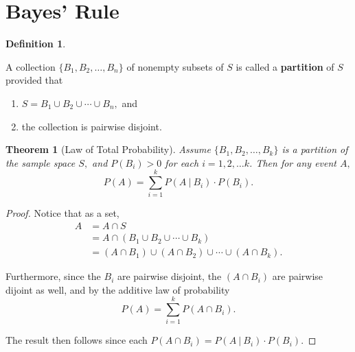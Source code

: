 \documentclass[
]{book}
\providecommand{\tightlist}{%
  \setlength{\itemsep}{0pt}\setlength{\parskip}{0pt}}
\newtheorem{theorem}{Theorem}[chapter]
\theoremstyle{definition}
\newtheorem{definition}{Definition}[chapter]
\theoremstyle{definition}
\theoremstyle{definition}
\theoremstyle{definition}
\theoremstyle{remark}
\begin{document}
\section{Bayes' Rule}\label{bayes-rule}

\begin{definition}
\protect\hypertarget{def:partition}{}\label{def:partition}

A collection \(\{B_1, B_2, \ldots, B_n\}\) of nonempty subsets of \(S\) is called a \textbf{partition} of \(S\) provided that

\begin{enumerate}
\def\labelenumi{\arabic{enumi}.}
\tightlist
\item
  \(S = B_1 \cup B_2 \cup \cdots \cup B_n,\) and
\item
  the collection is pairwise disjoint.
\end{enumerate}

\end{definition}

\begin{theorem}[Law of Total Probability]
\protect\hypertarget{thm:total-law-prob}{}\label{thm:total-law-prob}Assume \(\{B_1, B_2, \ldots, B_k\}\) is a partition of the sample space \(S,\) and \(P(B_i) > 0\) for each \(i = 1, 2, \ldots k\). Then for any event \(A,\) \[P(A) = \sum_{i=1}^k P(A~|~B_i)\cdot P(B_i).\]
\end{theorem}

\begin{proof}
Notice that as a set,
\begin{align*}
A &= A \cap S \\
  &= A \cap (B_1 \cup B_2 \cup \cdots \cup B_k) \\
  &= (A \cap B_1) \cup (A \cap B_2) \cup \cdots \cup (A \cap B_k).
\end{align*}

Furthermore, since the \(B_i\) are pairwise disjoint, the \((A \cap B_i)\) are pairwise dijoint as well, and by the additive law of probability \[P(A) = \sum_{i = 1}^k P(A \cap B_i).\]

The result then follows since each \(P(A \cap B_i) = P(A~|~B_i)\cdot P(B_i)\).
\end{proof}
\end{document}
